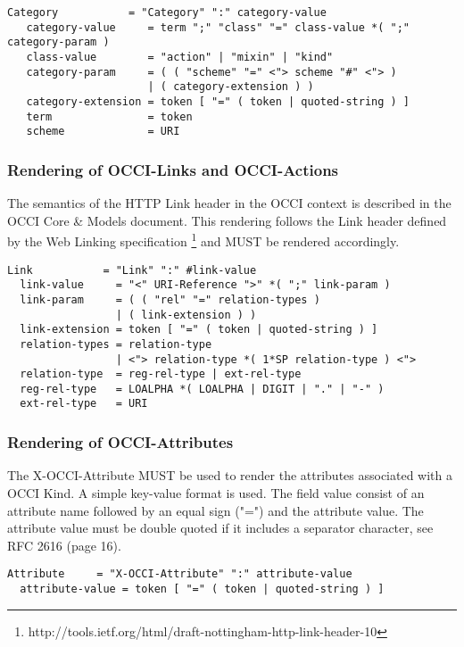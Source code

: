\documentclass[10pt,a4paper]{article}
\begin{document}
\begin{verbatim}
Category           = "Category" ":" category-value
   category-value     = term ";" "class" "=" class-value *( ";" category-param )
   class-value        = "action" | "mixin" | "kind"
   category-param     = ( ( "scheme" "=" <"> scheme "#" <"> )
                      | ( category-extension ) )
   category-extension = token [ "=" ( token | quoted-string ) ]
   term               = token
   scheme             = URI
\end{verbatim}

\subsubsection{Rendering of OCCI-Links and OCCI-Actions}
The semantics of the HTTP Link header in the OCCI context is described in
the OCCI Core \& Models document. This rendering follows the
  Link header defined by the Web Linking specification
  \footnote{http://tools.ietf.org/html/draft-nottingham-http-link-header-10} and
  MUST be rendered accordingly.

\begin{verbatim}
Link           = "Link" ":" #link-value
  link-value     = "<" URI-Reference ">" *( ";" link-param )
  link-param     = ( ( "rel" "=" relation-types )
                 | ( link-extension ) )
  link-extension = token [ "=" ( token | quoted-string ) ]
  relation-types = relation-type
                 | <"> relation-type *( 1*SP relation-type ) <">
  relation-type  = reg-rel-type | ext-rel-type
  reg-rel-type   = LOALPHA *( LOALPHA | DIGIT | "." | "-" )
  ext-rel-type   = URI
\end{verbatim}

\subsubsection{Rendering of OCCI-Attributes}
The X-OCCI-Attribute MUST be used to render the attributes associated
with a OCCI Kind. A simple key-value format is used. The field value
consist of an attribute name followed by an equal sign ("=") and the
attribute value. The attribute value must be double quoted if it
includes a separator character, see RFC 2616 (page 16).

\begin{verbatim}
Attribute     = "X-OCCI-Attribute" ":" attribute-value
  attribute-value = token [ "=" ( token | quoted-string ) ]
\end{verbatim}
\end{document}
